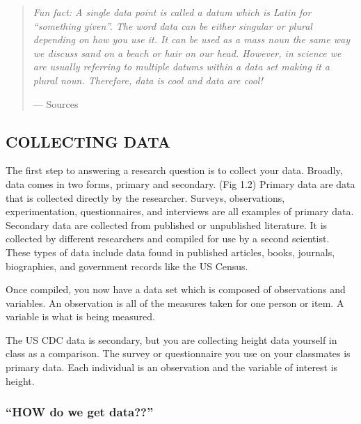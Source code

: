 \documentclass[
]{book}
\begin{document}
\begin{quote}
\emph{Fun fact: A single data point is called a datum which is Latin for ``something given''. The word data can be either singular or plural depending on how you use it. It can be used as a mass noun the same way we discuss sand on a beach or hair on our head. However, in science we are usually referring to multiple datums within a data set making it a plural noun. Therefore, data is cool and data are cool!}

--- Sources
\end{quote}

\hypertarget{collecting-data}{%
\subsection{COLLECTING DATA}\label{collecting-data}}

The first step to answering a research question is to collect your data. Broadly, data comes in two forms, primary and secondary. (Fig 1.2) Primary data are data that is collected directly by the researcher. Surveys, observations, experimentation, questionnaires, and interviews are all examples of primary data. Secondary data are collected from published or unpublished literature. It is collected by different researchers and compiled for use by a second scientist. These types of data include data found in published articles, books, journals, biographies, and government records like the US Census.

Once compiled, you now have a data set which is composed of observations and variables. An observation is all of the measures taken for one person or item. A variable is what is being measured.

The US CDC data is secondary, but you are collecting height data yourself in class as a comparison. The survey or questionnaire you use on your classmates is primary data. Each individual is an observation and the variable of interest is height.

\hypertarget{how-do-we-get-data}{%
\subsubsection{``HOW do we get data??''}\label{how-do-we-get-data}}
\end{document}
